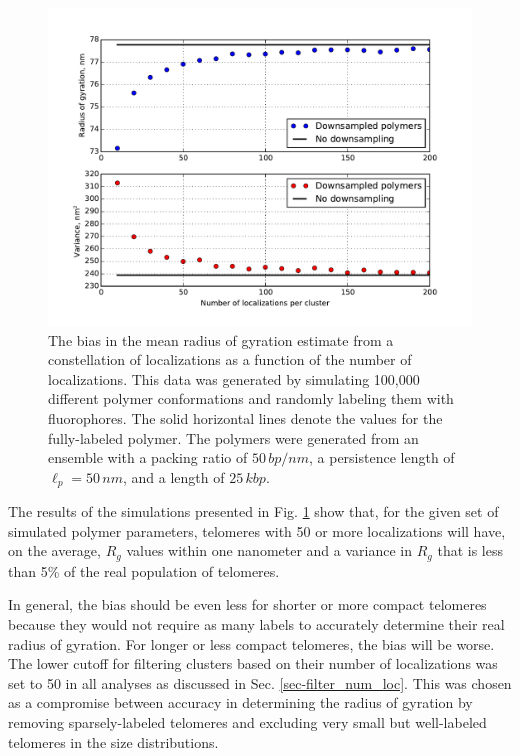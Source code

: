 \documentclass[12pt, a4paper]{article}
\begin{document}
\begin{figure}
  \centering
  \includegraphics[scale = 0.75]{fig-downsampling_subplots.pdf}
  \caption{The bias in the mean radius of gyration estimate from a constellation of localizations as a function of the number of localizations. This data was generated by simulating 100,000 different polymer conformations and randomly labeling them with fluorophores. The solid horizontal lines denote the values for the fully-labeled polymer. The polymers were generated from an ensemble with a packing ratio of $50 \, bp/nm$, a persistence length of $\ell_p = 50 \, nm$, and a length of $25 \, kbp$.}
  \label{fig-downsampling}
\end{figure}

The results of the simulations presented in
Fig. \ref{fig-downsampling} show that, for the given set of
simulated polymer parameters, telomeres with 50 or more
localizations will have, on the average, $R_g$ values within one
nanometer and a variance in $R_g$ that is less than 5\% of the
real population of telomeres.

In general, the bias should be even less for shorter or more
compact telomeres because they would not require as many labels to
accurately determine their real radius of gyration. For longer or
less compact telomeres, the bias will be worse. The lower cutoff
for filtering clusters based on their number of localizations was
set to 50 in all analyses as discussed in
Sec. \ref{sec-filter_num_loc}. This was chosen as a compromise
between accuracy in determining the radius of gyration by removing
sparsely-labeled telomeres and excluding very small but
well-labeled telomeres in the size distributions.
\end{document}
